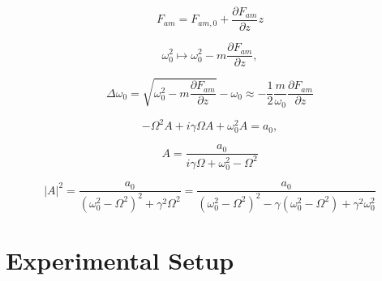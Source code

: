 \documentclass{a4paper,twoside,11pt}[scrartcl]
\begin{document}
\begin{equation}
F_{am}=F_{am,0}+\frac{\partial F_{am}}{\partial z}z
\end{equation}

\begin{equation}
\omega_{0}^{2}\mapsto\omega_{0}^{2}-m\frac{\partial F_{am}}{\partial z},
\end{equation}

\begin{equation}
\Delta\omega_{0}=\sqrt{\omega_{0}^{2}-m\frac{\partial F_{am}}{\partial z}}-\omega_{0}\approx-\frac{1}{2}\frac{m}{\omega_{0}}\frac{\partial F_{am}}{\partial z}
\end{equation}

\begin{equation}
-\Omega^{2}A+i\gamma\Omega A+\omega_{0}^{2}A=a_{0},
\end{equation}

\begin{equation}
A=\frac{a_{0}}{i\gamma\Omega+\omega_{0}^{2}-\Omega^{2}}
\end{equation}

\begin{equation}
|A|^{2}=\frac{a_{0}}{(\omega_{0}^{2}-\Omega^{2})^{2}+\gamma^{2}\Omega^{2}}=\frac{a_{0}}{(\omega_{0}^{2}-\Omega^{2})^{2}-\gamma(\omega_{0}^{2}-\Omega^{2})+\gamma^{2}\omega_{0}^{2}}
\end{equation}

\section{Experimental Setup}
\end{document}
